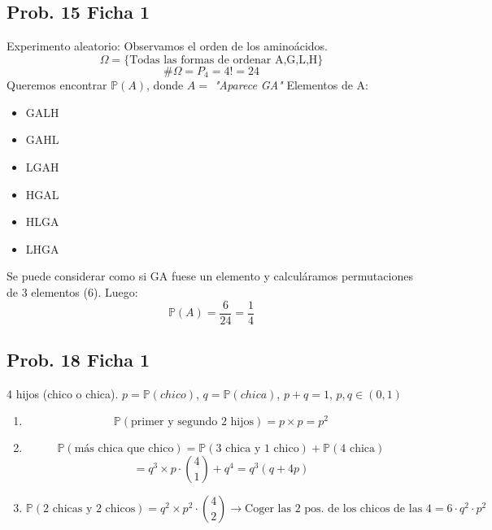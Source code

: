 \documentclass[11pt]{article}
\newcommand{\prob}{\mathbb{P}}
\newcommand{\OMG}{\varOmega}
\theoremstyle{plain}
\begin{document}
        \subsection{Prob. 15 Ficha 1} %
        \label{sub:prob_15_ficha_1}
            Experimento aleatorio: Observamos el orden de los aminoácidos.
            \[\OMG = \{\text{Todas las formas de ordenar A,G,L,H}\}\]
            \[\#\OMG = P_4 = 4! = 24\]
            Queremos encontrar $\prob(A)$, donde $A = $ \textit{"Aparece GA"}
            Elementos de A:
            \begin{itemize}
                \item GALH
                \item GAHL
                \item LGAH
                \item HGAL
                \item HLGA
                \item LHGA
            \end{itemize}
            Se puede considerar como si GA fuese un elemento y calculáramos permutaciones de 3 elementos (6). Luego:
            \[\prob(A) = \frac{6}{24} = \frac{1}{4}\]
        \subsection{Prob. 18 Ficha 1} %
        \label{sub:prob_18_ficha_1}
            4 hijos (chico o chica). $p = \prob(chico)$, $q = \prob(chica)$, $p+q = 1$, $p,q \in (0,1)$
            \begin{enumerate}[label=\Alph*]
                \item \[\prob(\text{primer y segundo 2 hijos}) = p\times p = p^2\]
                \item \[\prob(\text{más chica que chico}) = \prob(\text{3 chica y 1 chico}) + \prob(\text{4 chica})\] \[ = q^3 \times p \cdot \binom{4}{1} + q^4 = q^3 (q + 4p)\]
                \item \[\prob (\text{2 chicas y 2 chicos}) = q^2 \times p^2 \cdot \binom{4}{2} \rightarrow \text{Coger las 2 pos. de los chicos de las 4} = 6 \cdot q^2 \cdot p^2\]
            \end{enumerate}
\end{document}
